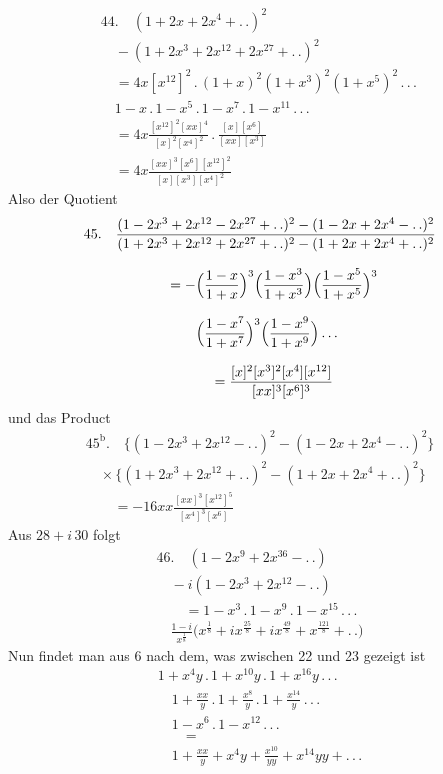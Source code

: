 \[
\begin{gathered}
44.\quad (1+2x+2x^4+ .\,.)^2\\[8pt]\quad{}-(1+2x^3+2x^{12}+2x^{27}+ .\,.)^2\\[8pt]
\quad=4x[x^{12}]^2\,.\,(1+x)^2(1+x^3)^2(1+x^5)^2\,.\,.\,.\,\\[8pt]\quad{}
1-x\,.\,1-x^5\,.\,1-x^7\,.\,1-x^{11}\,.\,.\,.\\[8pt]
\quad=4x\frac{[x^{12}]^2[xx]^4}{[x]^2[x^4]^2}\,.\,
\frac{[x][x^6]}{[xx][x^3]}
\\[8pt]\quad{}=4x\frac{[xx]^3[x^6][x^{12}]^2}{[x][x^3][x^4]^2}
\end{gathered}
\]
Also der Quotient
\[
\begin{gathered}
45.\quad \frac{(1-2x^3+2x^{12}-2x^{27}+ .\,.)^2-(1-2x+2x^4- .\,.)^2}
{(1+2x^3+2x^{12}+2x^{27}+ .\,.)^2-(1+2x+2x^4+ .\,.)^2}\\[8pt]
\qquad=-\Bigl(\frac{1-x}{1+x}\Bigr)^3
\Bigl(\frac{1-x^3}{1+x^3}\Bigr)
\Bigl(\frac{1-x^5}{1+x^5}\Bigr)^3
\\[8pt]\quad{}\Bigl(\frac{1-x^7}{1+x^7}\Bigr)^3
\Bigl(\frac{1-x^9}{1+x^9}\Bigr)\,.\,.\,.\\[8pt]
\qquad=\frac{[x]^2[x^3]^2[x^4][x^{12}]}{[xx]^3[x^6]^3}
\end{gathered}
\]
und das Product
\[
\begin{gathered}
45^{\mathrm b}.\quad \bigl\{(1-2x^3+2x^{12}- .\,.)^2-(1-2x+2x^4- .\,.)^2\bigr\}\\[8pt]
\quad\times\bigl\{(1+2x^3+2x^{12}+ .\,.)^2-(1+2x+2x^4+ .\,.)^2\bigr\}\\[8pt]
\qquad=-16xx\frac{[xx]^3[x^{12}]^5}{[x^4]^3[x^6]}
\end{gathered}
\]
Aus $28+i\,30$ folgt
\[
\begin{gathered}
46.\quad (1-2x^9+2x^{36}- .\,.)\\[8pt]\quad{}-i(1-2x^3+2x^{12}- .\,.)\\[8pt]
\qquad=1-x^3\,.\,1-x^9\,.\,1-x^{15}\,.\,.\,.\,
\\[8pt]\quad{}\frac{1-i}{x^{\frac18}}\bigl(x^{\frac18}+ix^{\frac{25}{8}}+ix^{\frac{49}{8}}+x^{\frac{121}{8}}+ .\,.\bigr)
\end{gathered}
\]
Nun findet man aus 6 nach dem, was zwischen 22 und 23 gezeigt ist
\[
\begin{gathered}
1+x^4y\,.\,1+x^{10}y\,.\,1+x^{16}y\,.\,.\,.\,
\\[8pt]\quad{}1+\frac{xx}{y}\,.\,1+\frac{x^8}{y}\,.\,1+\frac{x^{14}}{y}\,.\,.\,.\,\\[8pt]\quad{}
1-x^6\,.\,1-x^{12}\,.\,.\,.\\[8pt]
\qquad=\\[8pt]\quad{}1+\frac{xx}{y}+x^4y+\frac{x^{10}}{yy}+x^{14}yy+ .\,.\,.
\end{gathered}
\]
